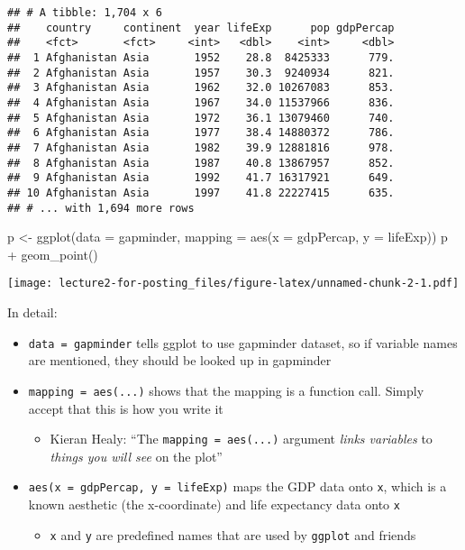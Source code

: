 \documentclass[
]{article}
\newenvironment{Shaded}{\begin{snugshade}}{\end{snugshade}}
\newcommand{\AttributeTok}[1]{\textcolor[rgb]{0.77,0.63,0.00}{#1}}
\newcommand{\FunctionTok}[1]{\textcolor[rgb]{0.00,0.00,0.00}{#1}}
\newcommand{\NormalTok}[1]{#1}
\newcommand{\OtherTok}[1]{\textcolor[rgb]{0.56,0.35,0.01}{#1}}
\newcommand{\SpecialCharTok}[1]{\textcolor[rgb]{0.00,0.00,0.00}{#1}}
\providecommand{\tightlist}{%
  \setlength{\itemsep}{0pt}\setlength{\parskip}{0pt}}
\begin{document}
\begin{verbatim}
## # A tibble: 1,704 x 6
##    country     continent  year lifeExp      pop gdpPercap
##    <fct>       <fct>     <int>   <dbl>    <int>     <dbl>
##  1 Afghanistan Asia       1952    28.8  8425333      779.
##  2 Afghanistan Asia       1957    30.3  9240934      821.
##  3 Afghanistan Asia       1962    32.0 10267083      853.
##  4 Afghanistan Asia       1967    34.0 11537966      836.
##  5 Afghanistan Asia       1972    36.1 13079460      740.
##  6 Afghanistan Asia       1977    38.4 14880372      786.
##  7 Afghanistan Asia       1982    39.9 12881816      978.
##  8 Afghanistan Asia       1987    40.8 13867957      852.
##  9 Afghanistan Asia       1992    41.7 16317921      649.
## 10 Afghanistan Asia       1997    41.8 22227415      635.
## # ... with 1,694 more rows
\end{verbatim}

\begin{Shaded}
\begin{Highlighting}[]
\NormalTok{p }\OtherTok{\textless{}{-}} \FunctionTok{ggplot}\NormalTok{(}\AttributeTok{data =}\NormalTok{ gapminder,}
            \AttributeTok{mapping =} \FunctionTok{aes}\NormalTok{(}\AttributeTok{x =}\NormalTok{ gdpPercap, }\AttributeTok{y =}\NormalTok{ lifeExp))}
\NormalTok{p }\SpecialCharTok{+} \FunctionTok{geom\_point}\NormalTok{()}
\end{Highlighting}
\end{Shaded}

\texttt{[image: lecture2-for-posting\_files/figure-latex/unnamed-chunk-2-1.pdf]}

In detail:

\begin{itemize}
\tightlist
\item
  \texttt{data\ =\ gapminder} tells ggplot to use gapminder dataset, so
  if variable names are mentioned, they should be looked up in gapminder
\item
  \texttt{mapping\ =\ aes(...)} shows that the mapping is a function
  call. Simply accept that this is how you write it

  \begin{itemize}
  \tightlist
  \item
    Kieran Healy: ``The \texttt{mapping\ =\ aes(...)} argument
    \emph{links variables} to \emph{things you will see} on the plot''
  \end{itemize}
\item
  \texttt{aes(x\ =\ gdpPercap,\ y\ =\ lifeExp)} maps the GDP data onto
  \texttt{x}, which is a known aesthetic (the x-coordinate) and life
  expectancy data onto \texttt{x}

  \begin{itemize}
  \tightlist
  \item
    \texttt{x} and \texttt{y} are predefined names that are used by
    \texttt{ggplot} and friends
  \end{itemize}
\end{itemize}
\end{document}
